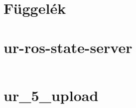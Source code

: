 \documentclass[12pt,a4paper]{article}
\begin{document}
	
    \makebibliography
	\makefigures
	\maketables
	
	\appendix
	
	\section*{Függelék}
	\begin{appendices}
		\section{ur-ros-state-server} 
		\label{appendix:ur-ros-state-server}
		\inputminted{js}{code/ur5_state_server.js}
		
		\pagebreak
		
		\section{ur\_5\_upload}
		\label{appendix:ur_5_upload}
		\inputminted{xml}{code/ur5_upload.launch}
	\end{appendices}
	
	\makeacknowledgement
	
\end{document}
